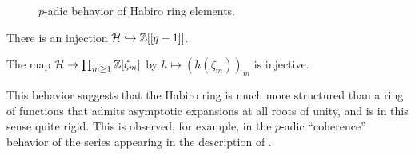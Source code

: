 \begin{figure}[H]

\caption{$p$-adic behavior of Habiro ring elements.}
\end{figure}
\begin{corollary}\label{corr: injection to power series in q minus 1}
    There is an injection $\mathcal{H}\hookrightarrow\mathbb{Z}[[q-1]]$. 
\end{corollary}
\begin{corollary}\label{corr: injection to product of adjointing roots of unity}
    The map $\mathcal{H}\to\prod_{m\geq 1}\mathbb{Z}[\zeta_{m}]$ by $h\mapsto (h(\zeta_{m}))_{m}$ is injective. 
\end{corollary}
This behavior suggests that the Habiro ring is much more structured than a ring of functions that admits asymptotic expansions at all roots of unity, and is in this sense quite rigid. This is observed, for example, in the $p$-adic ``coherence'' behavior of the series appearing in the description of .

